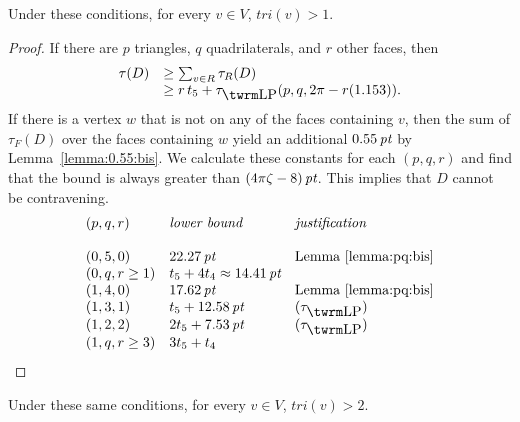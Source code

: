 \begin{lemma}  Under these conditions, for every $v\in V$,
$tri(v)>1$.
\end{lemma}

\begin{proof}
If there are $p$ triangles, $q$ quadrilaterals, and $r$ other
faces, then
    $$
    \begin{array}{lll}
    \tau(D) &\ge\sum_{v\in R}\tau_R(D)\\
        &\ge r\, t_5 + \tauLP(p,q,2\pi-r(1.153)).
    \end{array}
    $$ If there is a vertex $w$ that is
not on any of the faces containing $v$, then the sum of
$\tau_F(D)$ over the faces containing $w$ yield an additional
$0.55\,\hbox{\it pt}$ by Lemma~\ref{lemma:0.55:bis}. We calculate these
constants for each $(p,q,r)$ and find that the bound is always
greater than $(4\pi\zeta-8)\,\hbox{\it pt}$. This implies that $D$ cannot be
contravening.
$$\begin{array}{llll}
    (p,q,r)&\hbox{\it lower bound }&\hbox{\it justification}\\
    &\\
    (0,5,0)&22.27\,\pt&\text{Lemma~\ref{lemma:pq:bis}}\\
    (0,q,r\ge1)& t_5+4 t_4\approx 14.41\,\pt& \\
    (1,4,0) &17.62\,\pt &\text{Lemma~\ref{lemma:pq:bis}}\\
    (1,3,1) &t_5 + 12.58\,\pt &(\tauLP)\\
    (1,2,2) &2t_5 + 7.53\,\pt &(\tauLP)\\
    (1,q,r\ge3)& 3 t_5 + t_4& \\
\end{array}
$$
\end{proof}


\begin{lemma} Under these same conditions, for every $v\in V$,
$tri(v)>2$.
\end{lemma}

